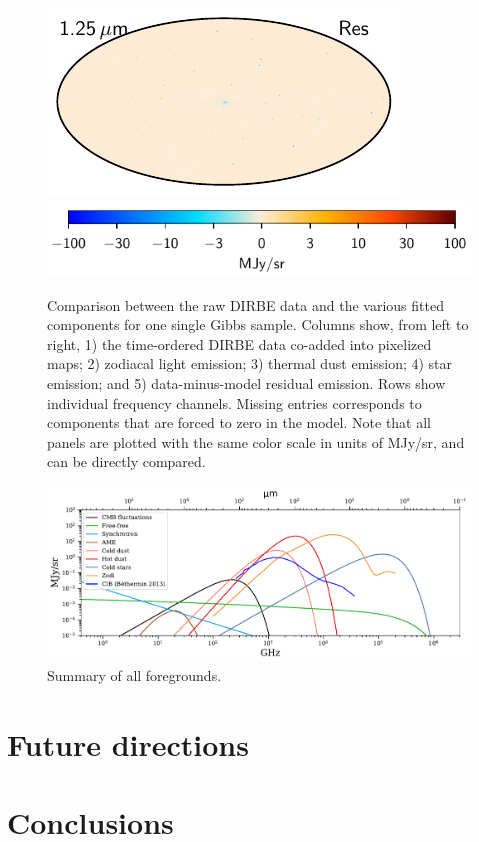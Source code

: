 \documentclass{aa}
\begin{document}
\begin{figure}
         \includegraphics[width=0.19\linewidth]{figures/compfreq_todres_01a_v01.pdf}\\
         \includegraphics[width=0.50\linewidth]{figures/colourbar_MJysr.pdf}
         \caption{Comparison between the raw DIRBE data and the various fitted components for one single Gibbs sample. Columns show, from left to right, 1) the time-ordered DIRBE data co-added into pixelized maps; 2) zodiacal light emission; 3) thermal dust emission; 4) star emission; and 5) data-minus-model residual emission. Rows show individual frequency channels. Missing entries corresponds to components that are forced to zero in the model. Note that all panels are plotted with the same color scale in units of MJy/sr, and can be directly compared.}
         \label{fig:comp_vs_freq}
       \end{figure}
       
       \begin{figure}
       	\centering
       	\includegraphics[width=\textwidth]{figures/all_fgs.pdf}
       	\caption{Summary of all foregrounds.}
       	\label{fig:SED_overview}
       \end{figure}



\clearpage
\section{Future directions}

\clearpage
\section{Conclusions}
\end{document}

